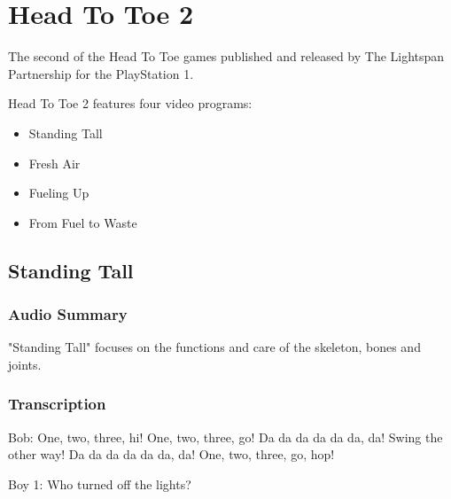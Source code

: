 \chapter{Head To Toe 2}


The second of the Head To Toe games published and released by The Lightspan Partnership for the PlayStation 1.

Head To Toe 2 features four video programs:

\begin{itemize}
    \item Standing Tall
    \item Fresh Air
    \item Fueling Up
    \item From Fuel to Waste
\end{itemize}

\clearpage
\newpage

\section{Standing Tall}

\subsection{Audio Summary}

"Standing Tall" focuses on the functions and care of the skeleton, bones and joints.

\subsection{Transcription}

Bob: One, two, three, hi! One, two, three, go! Da da da da da da, da! Swing the other way! Da da da da da da, da! One, two, three, go, hop!

Boy 1: Who turned off the lights?

